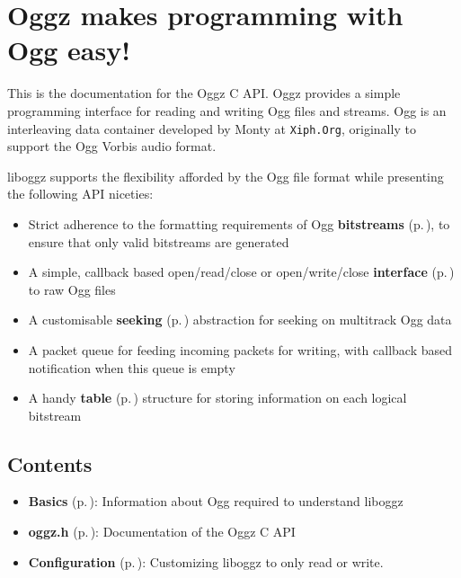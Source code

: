 \section{Oggz makes programming with Ogg easy!}\label{intro}
This is the documentation for the Oggz C API. Oggz provides a simple programming interface for reading and writing Ogg files and streams. Ogg is an interleaving data container developed by Monty at {\tt Xiph.Org}, originally to support the Ogg Vorbis audio format.

liboggz supports the flexibility afforded by the Ogg file format while presenting the following API niceties:

\begin{itemize}
\item Strict adherence to the formatting requirements of Ogg {\bf bitstreams }{\rm (p.\,\pageref{group__basics})}, to ensure that only valid bitstreams are generated\item A simple, callback based open/read/close or open/write/close {\bf interface }{\rm (p.\,\pageref{oggz_8h})} to raw Ogg files\item A customisable {\bf seeking }{\rm (p.\,\pageref{group__seek__api})} abstraction for seeking on multitrack Ogg data\item A packet queue for feeding incoming packets for writing, with callback based notification when this queue is empty\item A handy {\bf table }{\rm (p.\,\pageref{oggz__table_8h})} structure for storing information on each logical bitstream\end{itemize}
\subsection{Contents}\label{contents}
\begin{itemize}
\item {\bf Basics }{\rm (p.\,\pageref{group__basics})}: Information about Ogg required to understand liboggz\end{itemize}


\begin{itemize}
\item {\bf oggz.h }{\rm (p.\,\pageref{oggz_8h})}: Documentation of the Oggz C API\end{itemize}


\begin{itemize}
\item {\bf Configuration }{\rm (p.\,\pageref{group__configuration})}: Customizing liboggz to only read or write.\end{itemize}


